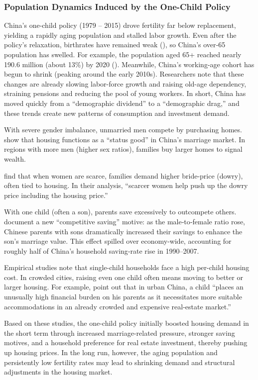\documentclass[12pt,english]{article}
\begin{document}
	\subsubsection{Population Dynamics Induced by the One-Child Policy}
	China’s one-child policy (1979 -- 2015) drove fertility far below replacement, yielding a rapidly aging population and stalled labor growth. Even after the policy’s relaxation, birthrates have remained weak (\citealp{imf2022china}), so China’s over‑65 population has swelled. For example, the population aged 65+ reached nearly 190.6 million (about 13\%) by 2020 (\citealp{fu2023demographic}). Meanwhile, China’s working-age cohort has begun to shrink (peaking around the early 2010s). Researchers note that these changes are already slowing labor-force growth and raising old-age dependency, straining pensions and reducing the pool of young workers. In short, China has moved quickly from a “demographic dividend” to a “demographic drag,” and these trends create new patterns of consumption and investment demand.
	
	With severe gender imbalance, unmarried men compete by purchasing homes. \cite{wei2012home} show that housing functions as a “status good” in China’s marriage market. In regions with more men (higher sex ratios), families buy larger homes to signal wealth.
	
	\cite{wei2016demand} find that when women are scarce, families demand higher bride-price (dowry), often tied to housing. In their analysis, “scarcer women help push up the dowry price including the housing price.”
	
	With one child (often a son), parents save excessively to outcompete others. \cite{wei2011competitive} document a new “competitive saving” motive: as the male‐to‐female ratio rose, Chinese parents with sons dramatically increased their savings to enhance the son’s marriage value. This effect spilled over economy-wide, accounting for roughly half of China’s household saving‐rate rise in 1990–2007.
	
	Empirical studies note that single-child households face a high per-child housing cost. In crowded cities, raising even one child often means moving to better or larger housing. For example, \cite{fu2023demographic} point out that in urban China, a child “places an unusually high financial burden on his parents as it necessitates more suitable accommodations in an already crowded and expensive real-estate market.”
	
	Based on these studies, the one-child policy initially boosted housing demand in the short term through increased marriage-related pressure, stronger saving motives, and a household preference for real estate investment, thereby pushing up housing prices. In the long run, however, the aging population and persistently low fertility rates may lead to shrinking demand and structural adjustments in the housing market.
	
\end{document}
